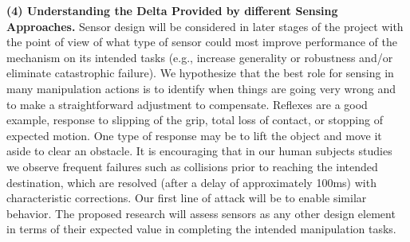  \smallskip\noindent
{\bf (4) Understanding the Delta Provided by different Sensing Approaches.}   Sensor design will be considered in later stages of the project with the point of view of what type of sensor could most improve performance of the mechanism on its intended tasks (e.g., increase generality or robustness and/or eliminate catastrophic failure).   We hypothesize that the best role for sensing in many manipulation actions is to identify when things are going very wrong and to make a straightforward adjustment to compensate.   Reflexes are a good example, response to slipping of the grip, total loss of contact, or stopping of expected motion.   One type of response may be to  lift the object and move it aside to clear an obstacle.     It is encouraging that in our human subjects studies we observe frequent failures such as collisions prior to reaching the intended destination, which are resolved (after a delay of approximately 100ms) with characteristic corrections.    Our first line of attack will be to enable similar behavior.  The proposed research  will assess sensors as any other design element in terms of their expected value in completing the intended manipulation tasks.

     

